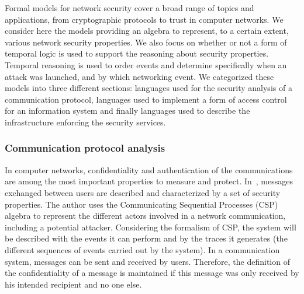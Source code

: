 Formal models for network security cover a broad range of topics and applications, from cryptographic protocols to trust in computer networks.
We consider here the models providing an algebra to represent, to a certain extent, various network security properties. 
We also focus on whether or not a form of temporal logic is used to support the reasoning about security properties.
Temporal reasoning is used to order events and determine specifically when an attack was launched, and by which networking event. 
We categorized these models into three different sections: languages used for the security analysis of a communication protocol, languages used to implement a form of access control for an information system and finally languages used to describe the infrastructure enforcing the security services.

\subsubsection{Communication protocol analysis}
In computer networks, confidentiality and authentication of the communications are among the most important properties to measure and protect.
In~\cite{CSP-Schneider1996}, messages exchanged between users are described and characterized by a set of security properties.
The author uses the Communicating Sequential Processes (CSP) algebra to represent the different actors involved in a network communication, including a potential attacker. 
Considering the formalism of CSP, the system will be described with the events it can perform and by the traces it generates (\ie the different sequences of events carried out by the system).
In a communication system, messages can be sent and received by users.
Therefore, the definition of the confidentiality of a message is maintained if this message was only received by his intended recipient and no one else.


